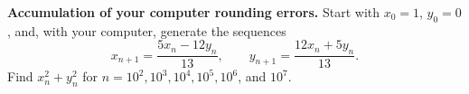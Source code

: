 \textbf{Accumulation of your computer rounding errors.} Start with $x_0 = 1$, $y_0 = 0$, and, with your computer, generate the sequences
\[ x_{n+1} = \frac{5x_n - 12y_n}{13},\qquad y_{n+1} = \frac{12x_n + 5y_n}{13}. \]
Find $x_n^2 + y_n^2$ for $n = 10^2, 10^3, 10^4, 10^5, 10^6$, and $10^7$.
